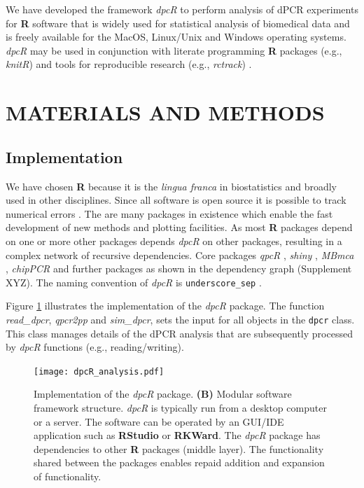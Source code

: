 \documentclass[a4,center,fleqn]{NAR}
\begin{document}
\enlargethispage{-65.1pt}
We have developed the framework \textit{dpcR} to perform analysis of dPCR 
experiments for \textbf{R} software that is widely used for statistical analysis 
of biomedical data and is freely available for the MacOS, Linux/Unix and Windows 
operating systems. \textit{dpcR}  may be used in conjunction with literate 
programming \textbf{R} packages (e.g., \textit{knitR}) and tools for 
reproducible research (e.g.,  \textit{rctrack}) \cite{liu_r_2014, rodiger_r_2015}. 

\section{MATERIALS AND METHODS}

\subsection{Implementation}

We have chosen \textbf{R} because it is the \textit{lingua franca} in 
biostatistics and broadly used in other disciplines. Since all software is open 
source it is possible to track numerical errors \cite{rodiger_r_2015}. The are 
many packages in existence which enable the fast development of new methods and 
plotting facilities. As most \textbf{R} packages depend on one or more other 
packages \cite{ooms_2013} depends \textit{dpcR} on other packages, resulting in 
a complex network of recursive dependencies. Core packages \textit{qpcR} 
\cite{ritz_qpcr_2008}, \textit{shiny} \cite{shiny}, \textit{MBmca} 
\cite{rodiger_surface_2013}, \textit{chipPCR} \cite{roediger2015chippcr} and 
further packages as shown in the dependency graph (Supplement XYZ). The naming 
convention of \textit{dpcR} is \texttt{underscore\_sep} \cite{Baaaath_2012}.

Figure \ref{dpcR_framework} illustrates the implementation of the \textit{dpcR} 
package. The function \textit{read\_dpcr}, \textit{qpcr2pp} and 
\textit{sim\_dpcr}, sets the input for all objects in the \texttt{dpcr} class. 
This class manages details of the dPCR analysis that are subsequently processed 
by \textit{dpcR} functions (e.g., reading/writing).

\begin{figure}[t]
\begin{center}
\texttt{[image: dpcR\_analysis.pdf]}
\end{center}
\caption{Implementation of the \textit{dpcR} package. \textbf{(B)} Modular software 
framework structure. \textit{dpcR} is typically run from a desktop computer or a 
server. The software can be operated by an GUI/IDE application such as 
\textbf{RStudio} or \textbf{RKWard}. The \textit{dpcR} package has dependencies 
to other \textbf{R} packages (middle layer). The functionality shared between 
the packages enables repaid addition and expansion of functionality.}
\label{dpcR_framework}
\end{figure}
\end{document}
